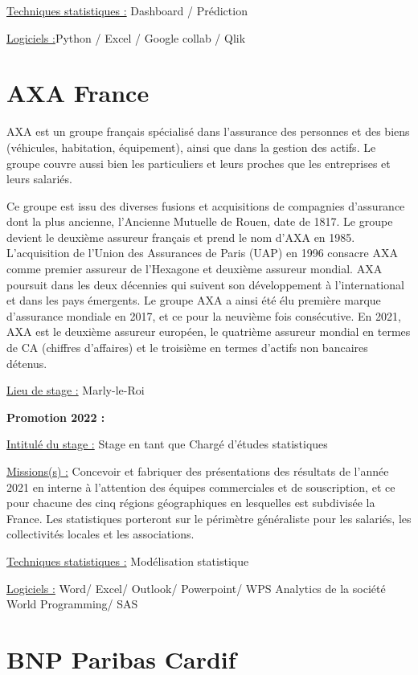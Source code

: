 \documentclass[
  letterpaper,
  DIV=11,
  numbers=noendperiod]{scrreprt}
\begin{document}
\uline{Techniques statistiques :} Dashboard / Prédiction

\uline{Logiciels :}Python / Excel / Google collab / Qlik

\hypertarget{axa-france}{%
\section{\texorpdfstring{\textbf{AXA
France}}{AXA France}}\label{axa-france}}

AXA est un groupe français spécialisé dans l'assurance des personnes et
des biens (véhicules, habitation, équipement), ainsi que dans la gestion
des actifs. Le groupe couvre aussi bien les particuliers et leurs
proches que les entreprises et leurs salariés.

Ce groupe est issu des diverses fusions et acquisitions de compagnies
d'assurance dont la plus ancienne, l'Ancienne Mutuelle de Rouen, date de
1817. Le groupe devient le deuxième assureur français et prend le nom
d'AXA en 1985. L'acquisition de l'Union des Assurances de Paris (UAP) en
1996 consacre AXA comme premier assureur de l'Hexagone et deuxième
assureur mondial. AXA poursuit dans les deux décennies qui suivent son
développement à l'international et dans les pays émergents. Le groupe
AXA a ainsi été élu première marque d'assurance mondiale en 2017, et ce
pour la neuvième fois consécutive. En 2021, AXA est le deuxième assureur
européen, le quatrième assureur mondial en termes de CA (chiffres
d'affaires) et le troisième en termes d'actifs non bancaires détenus.

\uline{Lieu de stage :} Marly-le-Roi

\textbf{Promotion 2022 :}

\uline{Intitulé du stage :} Stage en tant que Chargé d'études
statistiques

\uline{Missions(s) :} Concevoir et fabriquer des présentations des
résultats de l'année 2021 en interne à l'attention des équipes
commerciales et de souscription, et ce pour chacune des cinq régions
géographiques en lesquelles est subdivisée la France. Les statistiques
porteront sur le périmètre généraliste pour les salariés, les
collectivités locales et les associations.

\uline{Techniques statistiques :} Modélisation statistique

\uline{Logiciels :} Word/ Excel/ Outlook/ Powerpoint/ WPS Analytics de
la société World Programming/ SAS

\hypertarget{bnp-paribas-cardif}{%
\section{\texorpdfstring{\textbf{BNP Paribas
Cardif}}{BNP Paribas Cardif}}\label{bnp-paribas-cardif}}
\end{document}

